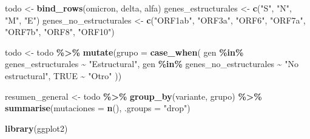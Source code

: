 \documentclass[
]{article}
\newenvironment{Shaded}{\begin{snugshade}}{\end{snugshade}}
\newcommand{\AttributeTok}[1]{\textcolor[rgb]{0.13,0.29,0.53}{#1}}
\newcommand{\ConstantTok}[1]{\textcolor[rgb]{0.56,0.35,0.01}{#1}}
\newcommand{\FunctionTok}[1]{\textcolor[rgb]{0.13,0.29,0.53}{\textbf{#1}}}
\newcommand{\NormalTok}[1]{#1}
\newcommand{\OtherTok}[1]{\textcolor[rgb]{0.56,0.35,0.01}{#1}}
\newcommand{\SpecialCharTok}[1]{\textcolor[rgb]{0.81,0.36,0.00}{\textbf{#1}}}
\newcommand{\StringTok}[1]{\textcolor[rgb]{0.31,0.60,0.02}{#1}}
\begin{document}
\begin{Shaded}
\end{Shaded}

\begin{Shaded}
\begin{Highlighting}[]
\NormalTok{todo }\OtherTok{\textless{}{-}} \FunctionTok{bind\_rows}\NormalTok{(omicron, delta, alfa)}
\NormalTok{genes\_estructurales }\OtherTok{\textless{}{-}} \FunctionTok{c}\NormalTok{(}\StringTok{"S"}\NormalTok{, }\StringTok{"N"}\NormalTok{, }\StringTok{"M"}\NormalTok{, }\StringTok{"E"}\NormalTok{)}
\NormalTok{genes\_no\_estructurales }\OtherTok{\textless{}{-}} \FunctionTok{c}\NormalTok{(}\StringTok{"ORF1ab"}\NormalTok{, }\StringTok{"ORF3a"}\NormalTok{, }\StringTok{"ORF6"}\NormalTok{, }\StringTok{"ORF7a"}\NormalTok{, }\StringTok{"ORF7b"}\NormalTok{, }\StringTok{"ORF8"}\NormalTok{, }\StringTok{"ORF10"}\NormalTok{)}

\NormalTok{todo }\OtherTok{\textless{}{-}}\NormalTok{ todo }\SpecialCharTok{\%\textgreater{}\%}
  \FunctionTok{mutate}\NormalTok{(}\AttributeTok{grupo =} \FunctionTok{case\_when}\NormalTok{(}
\NormalTok{    gen }\SpecialCharTok{\%in\%}\NormalTok{ genes\_estructurales }\SpecialCharTok{\textasciitilde{}} \StringTok{"Estructural"}\NormalTok{,}
\NormalTok{    gen }\SpecialCharTok{\%in\%}\NormalTok{ genes\_no\_estructurales }\SpecialCharTok{\textasciitilde{}} \StringTok{"No estructural"}\NormalTok{,}
    \ConstantTok{TRUE} \SpecialCharTok{\textasciitilde{}} \StringTok{"Otro"}
\NormalTok{  ))}


\NormalTok{resumen\_general }\OtherTok{\textless{}{-}}\NormalTok{ todo }\SpecialCharTok{\%\textgreater{}\%}
  \FunctionTok{group\_by}\NormalTok{(variante, grupo) }\SpecialCharTok{\%\textgreater{}\%}
  \FunctionTok{summarise}\NormalTok{(}\AttributeTok{mutaciones =} \FunctionTok{n}\NormalTok{(), }\AttributeTok{.groups =} \StringTok{"drop"}\NormalTok{)}

\FunctionTok{library}\NormalTok{(ggplot2)}


\end{Highlighting}
\end{Shaded}
\end{document}
